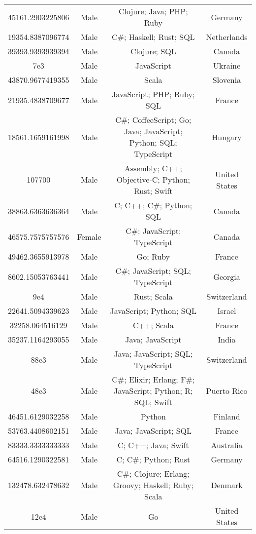 \begin{center}
\begin{tabular}{ |c|c|c|c| }
45161.2903225806  &  Male  &  Clojure; Java; PHP; Ruby  &  Germany  \\ 
19354.8387096774  &  Male  &  C\#; Haskell; Rust; SQL  &  Netherlands  \\ 
39393.9393939394  &  Male  &  Clojure; SQL  &  Canada  \\ 
7e3  &  Male  &  JavaScript  &  Ukraine  \\ 
43870.9677419355  &  Male  &  Scala  &  Slovenia  \\ 
21935.4838709677  &  Male  &  JavaScript; PHP; Ruby; SQL  &  France  \\ 
18561.1659161998  &  Male  &  C\#; CoffeeScript; Go; Java; JavaScript; Python; SQL; TypeScript  &  Hungary  \\ 
107700  &  Male  &  Assembly; C++; Objective-C; Python; Rust; Swift  &  United States  \\ 
38863.6363636364  &  Male  &  C; C++; C\#; Python; SQL  &  Canada  \\ 
46575.7575757576  &  Female  &  C\#; JavaScript; TypeScript  &  Canada  \\ 
49462.3655913978  &  Male  &  Go; Ruby  &  France  \\ 
8602.15053763441  &  Male  &  C\#; JavaScript; SQL; TypeScript  &  Georgia  \\ 
9e4  &  Male  &  Rust; Scala  &  Switzerland  \\ 
22641.5094339623  &  Male  &  JavaScript; Python; SQL  &  Israel  \\ 
32258.064516129  &  Male  &  C++; Scala  &  France  \\ 
35237.1164293055  &  Male  &  Java; JavaScript  &  India  \\ 
88e3  &  Male  &  Java; JavaScript; SQL; TypeScript  &  Switzerland  \\ 
48e3  &  Male  &  C\#; Elixir; Erlang; F\#; JavaScript; Python; R; SQL; Swift  &  Puerto Rico  \\ 
46451.6129032258  &  Male  &  Python  &  Finland  \\ 
53763.4408602151  &  Male  &  Java; JavaScript; SQL  &  France  \\ 
83333.3333333333  &  Male  &  C; C++; Java; Swift  &  Australia  \\ 
64516.1290322581  &  Male  &  C; C\#; Python; Rust  &  Germany  \\ 
132478.632478632  &  Male  &  C\#; Clojure; Erlang; Groovy; Haskell; Ruby; Scala  &  Denmark  \\ 
12e4  &  Male  &  Go  &  United States  \\ 

\end{tabular}
\end{center}
